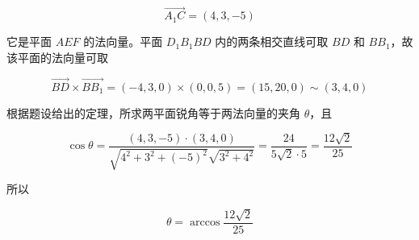\begin{answer}
\nopagebreak[4]
\[
\overrightarrow{A_1C}=(4,3,-5)
\]

它是平面 $AEF$ 的法向量。平面 $D_1B_1BD$ 内的两条相交直线可取 $BD$ 和 $BB_1$，故该平面的法向量可取

\nopagebreak[4]
\[
\overrightarrow{BD}\times\overrightarrow{BB_1}
=(-4,3,0)\times(0,0,5)
=(15,20,0)
\sim(3,4,0)
\]

根据题设给出的定理，所求两平面锐角等于两法向量的夹角 $\theta$，且

\nopagebreak[4]
\[
\cos\theta
=\frac{(4,3,-5)\cdot(3,4,0)}
{\sqrt{4^2+3^2+(-5)^2}\sqrt{3^2+4^2}}
=\frac{24}{5\sqrt2\cdot5}
=\frac{12\sqrt2}{25}
\]

所以

\nopagebreak[4]
\[
\theta=\arccos\frac{12\sqrt2}{25}
\]



\end{answer}
